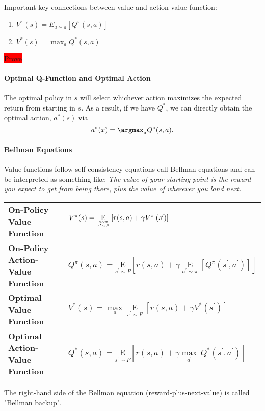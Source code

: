 Important key connections between value and action-value function:
\begin{enumerate}
    \item
        $V^{\pi}(s) = E_{a \sim \pi} [Q^{\pi}(s,a)]$
    \item
        $V^*(s) = \max_{a} Q^*(s,a)$
\end{enumerate}
\colorbox{red}{Prove}

\paragraph{Optimal Q-Function and Optimal Action}
The optimal policy in $s$ will select whichever action maximizes the expected return from starting in $s$. As a result, if we have $Q^*$, we can directly obtain the optimal action, $a^*(s)$ via
$$a^*(x) = \argmax_{a} Q^*(s,a).$$

\paragraph{Bellman Equations}
Value functions follow self-consistency equations call Bellman equations and can be interpreted as something like: \textit{The value of your starting point is the reward you expect to get from being there, plus the value of wherever you land next.}

\begin{tabular}{ll}
    \textbf{On-Policy Value Function} &\( V^{\pi}(s)=\underset{a \sim \pi \atop s^{\prime} \sim P}{\operatorname{E}}\left[r(s, a)+\gamma V^{\pi}\left(s^{\prime}\right)\right] \) \\
    \textbf{On-Policy Action-Value Function} &\( Q^{\pi}(s, a)=\underset{s^{\prime} \sim P}{\mathrm{E}}\left[r(s, a)+\gamma \underset{a^{\prime}\sim \pi}{\operatorname{E}} \left[Q^{\pi}\left(s^{\prime}, a^{\prime}\right)\right]\right] \) \\
    \textbf{Optimal Value Function} & \( V^{*}(s)=\underset{a}{\max} \underset{s^{\prime}\sim P}{\operatorname{E}} \left[r(s, a)+\gamma V^{*}\left(s^{\prime}\right)\right] \) \\
    \textbf{Optimal Action-Value Function} &\( Q^{*}(s, a)=\underset{s^{\prime} \sim P}{\mathrm{E}}\left[r(s, a)+\gamma \underset{a^{\prime}}{\max}\, Q^{*}\left(s^{\prime}, a^{\prime}\right)\right] \) 
\end{tabular}

The right-hand side of the Bellman equation (reward-plus-next-value) is called "Bellman backup".

